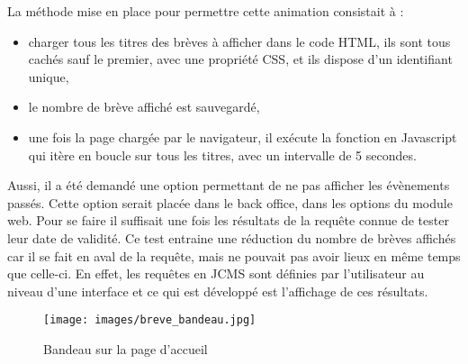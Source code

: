 \documentclass[12pt,a4paper]{article}
\begin{document}
La méthode mise en place pour permettre cette animation consistait à :
\begin{itemize}
\item charger tous les titres des brèves à afficher dans le code HTML, ils sont tous cachés sauf le premier, avec une propriété CSS, et ils dispose d'un identifiant unique,
\item le nombre de brève affiché est sauvegardé,
\item une fois la page chargée par le navigateur, il exécute la fonction en Javascript qui itère en boucle sur tous les titres, avec un intervalle de 5 secondes.
\end{itemize}
Aussi, il a été demandé une option permettant de ne pas afficher les évènements passés. Cette option serait placée dans le back office, dans les options du module web. Pour se faire il suffisait une fois les résultats de la requête connue de tester leur date de validité. Ce test entraine une réduction du nombre de brèves affichés car il se fait en aval de la requête, mais ne pouvait pas avoir lieux en même temps que celle-ci. En effet, les requêtes en \gls{JCMS} sont définies par l'utilisateur au niveau d'une interface et ce qui est développé est l'affichage de ces résultats.\par
\begin{figure}[h!]
\centering\texttt{[image: images/breve\_bandeau.jpg]} 
\caption{Bandeau sur la page d'accueil}
\end{figure}
\end{document}

